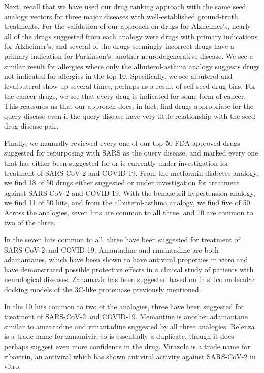 \documentclass{article}
\begin{document}
Next, recall that we have used our drug ranking approach with the same seed analogy vectors for three major diseases with well-established ground-truth treatments.
For the validation of our approach on drugs for Alzheimer's, nearly all of the drugs suggested from each analogy were drugs with primary indications for Alzheimer's, and several of the drugs seemingly incorrect drugs have a primary indication for Parkinson's, another neurodegenerative disease.
We see a similar result for allergies where only the albuterol-asthma analogy suggests drugs not indicated for allergies in the top 10.
Specifically, we see albuterol and levalbuterol show up several times, perhaps as a result of self seed drug bias.
For the cancer drugs, we see that every drug is indicated for some form of cancer.
This reassures us that our approach does, in fact, find drugs appropriate for the query disease even if the query disease have very little relationship with the seed drug-disease pair.

Finally, we manually reviewed every one of our top 50 FDA approved drugs suggested for repurposing with SARS as the query disease, and marked every one that has either been suggested for or is currently under investigation for treatment of SARS-CoV-2 and COVID-19.
From the metformin-diabetes analogy, we find 18 of 50 drugs either suggested or under investigation for treatment against SARS-CoV-2 and COVID-19.
With the benazepril-hypertension analogy, we find 11 of 50 hits, and from the albuterol-asthma analogy, we find five of 50.
Across the analogies, seven hits are common to all three, and 10 are common to two of the three.

In the seven hits common to all, three have been suggested for treatment of SARS-CoV-2 and COVID-19.
Amantadine and rimantadine are both adamantanes, which have been shown to have antiviral properties in vitro and have demonstrated possible protective effects in a clinical study of patients with neurological diseases\cite{rejdak2020adamantanes,cimolai2020potentially}.
Zanamavir has been suggested based on in silico molecular docking models of the 3C-like proteinase previously mentioned\cite{hall2020search}.

In the 10 hits common to two of the analogies, three have been suggested for treatment of SARS-CoV-2 and COVID-19.
Memantine is another adamantane similar to amantadine and rimantadine suggested by all three analogies.
Relenza is a trade name for zanamivir, so is essentially a duplicate, though it does perhaps suggest even more confidence in the drug.
Virazole is a trade name for ribavirin, an antiviral which has shown antiviral activity against SARS-CoV-2 in vitro.
\end{document}
